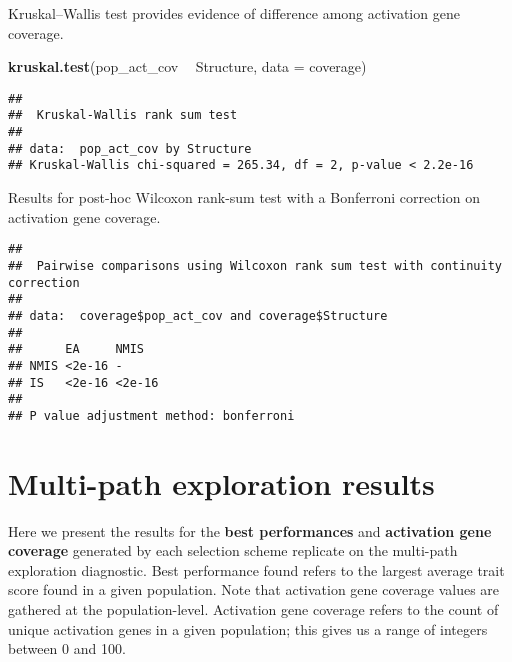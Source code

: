\documentclass[]{book}
\newenvironment{Shaded}{\begin{snugshade}}{\end{snugshade}}
\newcommand{\DataTypeTok}[1]{\textcolor[rgb]{0.13,0.29,0.53}{#1}}
\newcommand{\KeywordTok}[1]{\textcolor[rgb]{0.13,0.29,0.53}{\textbf{#1}}}
\newcommand{\NormalTok}[1]{#1}
\newcommand{\OperatorTok}[1]{\textcolor[rgb]{0.81,0.36,0.00}{\textbf{#1}}}
\newcommand{\OtherTok}[1]{\textcolor[rgb]{0.56,0.35,0.01}{#1}}
\newcommand{\StringTok}[1]{\textcolor[rgb]{0.31,0.60,0.02}{#1}}
\begin{document}
Kruskal--Wallis test provides evidence of difference among activation gene coverage.

\begin{Shaded}
\begin{Highlighting}[]
\KeywordTok{kruskal.test}\NormalTok{(pop_act_cov }\OperatorTok{~}\StringTok{ }\NormalTok{Structure, }\DataTypeTok{data =}\NormalTok{ coverage)}
\end{Highlighting}
\end{Shaded}

\begin{verbatim}
## 
##  Kruskal-Wallis rank sum test
## 
## data:  pop_act_cov by Structure
## Kruskal-Wallis chi-squared = 265.34, df = 2, p-value < 2.2e-16
\end{verbatim}

Results for post-hoc Wilcoxon rank-sum test with a Bonferroni correction on activation gene coverage.

\begin{Shaded}
\end{Shaded}

\begin{verbatim}
## 
##  Pairwise comparisons using Wilcoxon rank sum test with continuity correction 
## 
## data:  coverage$pop_act_cov and coverage$Structure 
## 
##      EA     NMIS  
## NMIS <2e-16 -     
## IS   <2e-16 <2e-16
## 
## P value adjustment method: bonferroni
\end{verbatim}

\hypertarget{multi-path-exploration-results}{%
\chapter{Multi-path exploration results}\label{multi-path-exploration-results}}

Here we present the results for the \textbf{best performances} and \textbf{activation gene coverage} generated by each selection scheme replicate on the multi-path exploration diagnostic.
Best performance found refers to the largest average trait score found in a given population.
Note that activation gene coverage values are gathered at the population-level.
Activation gene coverage refers to the count of unique activation genes in a given population; this gives us a range of integers between 0 and 100.
\end{document}
